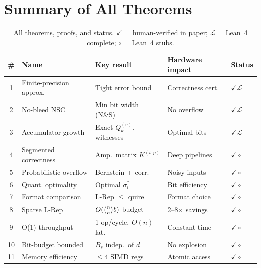 \documentclass[11pt,a4paper]{article}
\theoremstyle{definition}
\theoremstyle{plain}
\theoremstyle{remark}
\begin{document}
\section{Summary of All Theorems}
\label{app:summary}
\begin{table}[h]
\centering
\caption{All theorems, proofs, and status. $\checkmark$ = human-verified in paper;
$\mathcal{L}$ = Lean~4 complete; $\circ$ = Lean~4 stubs.}
\label{tab:all-thms}
\small
\begin{tabular}{cllll}
\toprule
\# & Name & Key result & Hardware impact & Status \\
\midrule
1 & Finite-precision approx. & Tight error bound & Correctness cert. & $\checkmark\mathcal{L}$ \\
2 & No-bleed NSC & Min bit width (N\&S) & No overflow & $\checkmark\mathcal{L}$ \\
3 & Accumulator growth & Exact $Q_k^{(v)}$, witnesses & Optimal bits & $\checkmark\mathcal{L}$ \\
4 & Segmented correctness & Amp.\ matrix $K^{(t:p)}$ & Deep pipelines & $\checkmark\circ$ \\
5 & Probabilistic overflow & Bernstein + corr. & Noisy inputs & $\checkmark\circ$ \\
6 & Quant. optimality & Optimal $\sigma_i^*$ & Bit efficiency & $\checkmark\circ$ \\
7 & Format comparison & L-Rep $\le$ quire & Format choice & $\checkmark\circ$ \\
8 & Sparse L-Rep & $O(\tbinom{n}{\kappa}b)$ budget & 2--8$\times$ savings & $\checkmark\circ$ \\
9 & O(1) throughput & 1 op/cycle, $O(n)$ lat. & Constant time & $\checkmark\circ$ \\
10 & Bit-budget bounded & $B_s$ indep.\ of $d$ & No explosion & $\checkmark\circ$ \\
11 & Memory efficiency & $\le 4$ SIMD regs & Atomic access & $\checkmark\circ$ \\
\bottomrule
\end{tabular}
\end{table}
\end{document}
